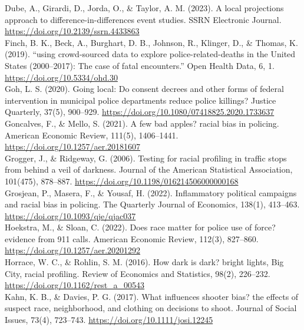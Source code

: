 \documentclass[12pt,a4paper]{article}
\begin{document}
Dube, A., Girardi, D., Jorda, O., \& Taylor, A. M. (2023). A local projections approach to difference-in-differences event studies. SSRN Electronic Journal. \url{https://doi.org/10.2139/ssrn.4433863} \\

Finch, B. K., Beck, A., Burghart, D. B., Johnson, R., Klinger, D., \& Thomas, K. (2019). “using crowd-sourced data to explore police-related-deaths in the United States (2000–2017): The case of fatal encounters.” Open Health Data, 6, 1. \url{https://doi.org/10.5334/ohd.30} \\

Goh, L. S. (2020). Going local: Do consent decrees and other forms of federal intervention in municipal police departments reduce police killings? Justice Quarterly, 37(5), 900–929. \url{https://doi.org/10.1080/07418825.2020.1733637} \\

Goncalves, F., \& Mello, S. (2021). A few bad apples? racial bias in policing. American Economic Review, 111(5), 1406–1441. \url{https://doi.org/10.1257/aer.20181607} \\

Grogger, J., \& Ridgeway, G. (2006). Testing for racial profiling in traffic stops from behind a veil of darkness. Journal of the American Statistical Association, 101(475), 878–887. \url{https://doi.org/10.1198/016214506000000168} \\

Grosjean, P., Masera, F., \& Yousaf, H. (2022). Inflammatory political campaigns and racial bias in policing. The Quarterly Journal of Economics, 138(1), 413–463. \url{https://doi.org/10.1093/qje/qjac037} \\

Hoekstra, M., \& Sloan, C. (2022). Does race matter for police use of force? evidence from 911 calls. American Economic Review, 112(3), 827–860. \url{https://doi.org/10.1257/aer.20201292} \\

Horrace, W. C., \& Rohlin, S. M. (2016). How dark is dark? bright lights, Big City, racial profiling. Review of Economics and Statistics, 98(2), 226–232. \url{https://doi.org/10.1162/rest\_a\_00543} \\

Kahn, K. B., \& Davies, P. G. (2017). What influences shooter bias? the effects of suspect race, neighborhood, and clothing on decisions to shoot. Journal of Social Issues, 73(4), 723–743. \url{https://doi.org/10.1111/josi.12245} \\
\end{document}
